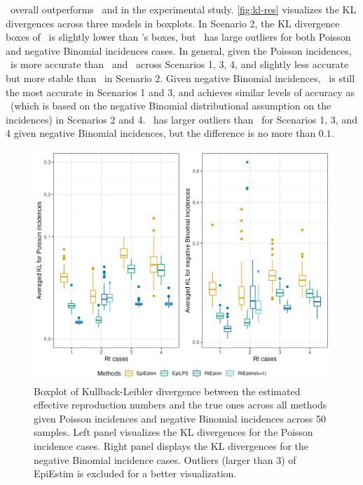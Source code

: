 \RtEstim\ overall outperforms \EpiEstim\ and \EpiLPS in the experimental study. \autoref{fig:kl-res} visualizes the KL divergences across three models in boxplots. In Scenario 2, the KL divergence boxes of \EpiLPS\ is slightly lower than \RtEstim's boxes, but \EpiLPS\ has large outliers for both Poisson and negative Binomial incidences cases. In general, given the Poisson incidences, \RtEstim\ is more accurate than \EpiEstim\ and \EpiLPS\ across Scenarios 1, 3, 4, and slightly less accurate but more stable than \EpiLPS\ in Scenario 2. Given negative Binomial incidences, \RtEstim\ is still the most accurate in Scenarios 1 and 3, and achieves similar levels of accuracy as \EpiLPS\ (which is based on the negative Binomial distributional assumption on the incidences) in Scenarios 2 and 4. \RtEstim\ has larger outliers than \EpiLPS\ for Scenarios 1, 3, and 4 given negative Binomial incidences, but the difference is no more than $0.1$. 
\begin{figure}[htb]
    \centering
    \includegraphics*[width=160mm]{fig/kl.png}
    \caption{Boxplot of Kullback-Leibler divergence between the estimated effective reproduction numbers and the true ones across all methods given Poisson incidences and negative Binomial incidences across 50 samples. Left panel visualizes the KL divergences for the Poisson incidence cases. Right panel displays the KL divergences for the negative Binomial incidence cases. Outliers (larger than $3$) of EpiEstim is excluded for a better visualization.} 
    \label{fig:kl-res}
\end{figure}

